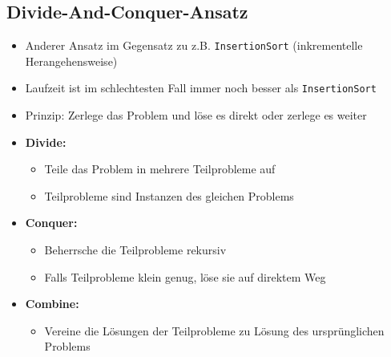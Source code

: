 \subsection{Divide-And-Conquer-Ansatz}
    \begin{itemize}
        \item Anderer Ansatz im Gegensatz zu z.B. \texttt{InsertionSort} (inkrementelle Herangehensweise)
        \item Laufzeit ist im schlechtesten Fall immer noch besser als \texttt{InsertionSort}
        \item Prinzip: Zerlege das Problem und löse es direkt oder zerlege es weiter
        \item \textbf{Divide:} 
            \begin{itemize}
                \item Teile das Problem in mehrere Teilprobleme auf
                \item Teilprobleme sind Instanzen des gleichen Problems 
            \end{itemize}
        \item \textbf{Conquer:} 
            \begin{itemize}
                \item Beherrsche die Teilprobleme rekursiv
                \item Falls Teilprobleme klein genug, löse sie auf direktem Weg
            \end{itemize}
        \item \textbf{Combine:} 
            \begin{itemize}
                \item Vereine die Lösungen der Teilprobleme zu Lösung des ursprünglichen Problems
            \end{itemize}
    \end{itemize}


